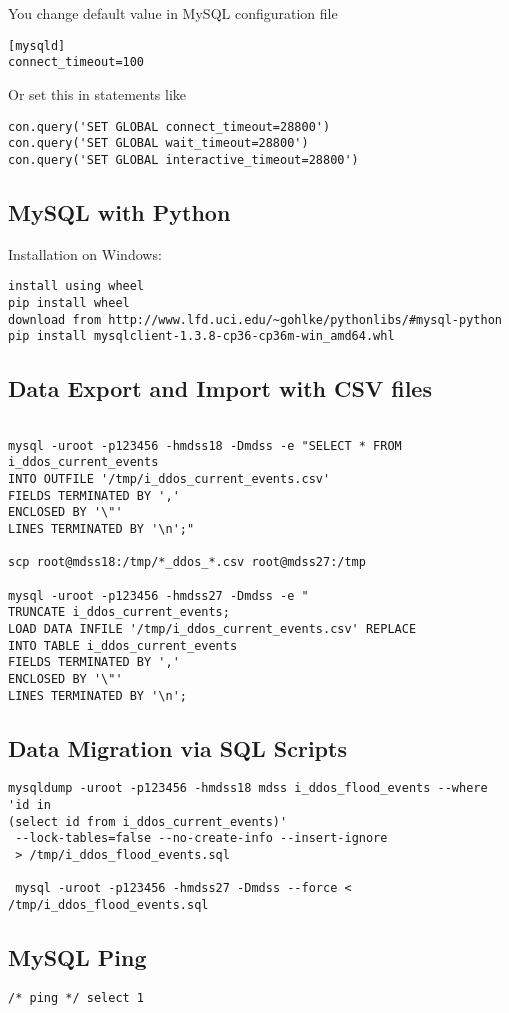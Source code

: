 You change default value in MySQL configuration file

\begin{verbatim}
[mysqld]
connect_timeout=100
\end{verbatim}

Or set this in statements like
\begin{verbatim}
con.query('SET GLOBAL connect_timeout=28800')
con.query('SET GLOBAL wait_timeout=28800')
con.query('SET GLOBAL interactive_timeout=28800')
\end{verbatim}


\subsection{MySQL with Python}

Installation on Windows:
\begin{verbatim}
install using wheel
pip install wheel
download from http://www.lfd.uci.edu/~gohlke/pythonlibs/#mysql-python
pip install mysqlclient-1.3.8-cp36-cp36m-win_amd64.whl
\end{verbatim}


\subsection{Data Export and Import with CSV files}

\begin{verbatim}

mysql -uroot -p123456 -hmdss18 -Dmdss -e "SELECT * FROM i_ddos_current_events
INTO OUTFILE '/tmp/i_ddos_current_events.csv'
FIELDS TERMINATED BY ','
ENCLOSED BY '\"'
LINES TERMINATED BY '\n';"

scp root@mdss18:/tmp/*_ddos_*.csv root@mdss27:/tmp

mysql -uroot -p123456 -hmdss27 -Dmdss -e "
TRUNCATE i_ddos_current_events;
LOAD DATA INFILE '/tmp/i_ddos_current_events.csv' REPLACE
INTO TABLE i_ddos_current_events
FIELDS TERMINATED BY ','
ENCLOSED BY '\"'
LINES TERMINATED BY '\n';

\end{verbatim}


\subsection{Data Migration via SQL Scripts}

\begin{verbatim}
mysqldump -uroot -p123456 -hmdss18 mdss i_ddos_flood_events --where 'id in
(select id from i_ddos_current_events)'
 --lock-tables=false --no-create-info --insert-ignore 
 > /tmp/i_ddos_flood_events.sql
 
 mysql -uroot -p123456 -hmdss27 -Dmdss --force < /tmp/i_ddos_flood_events.sql
\end{verbatim}

\subsection{MySQL Ping}
\begin{verbatim}
/* ping */ select 1
\end{verbatim}



